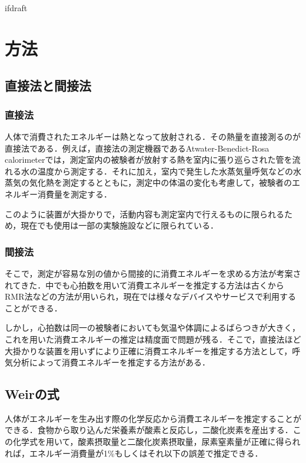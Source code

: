 \expandafter\ifx\csname ifdraft\endcsname\relax
 
\fi

\section{方法}

\subsection{直接法と間接法}

\subsubsection{直接法}

人体で消費されたエネルギーは熱となって放射される．その熱量を直接測るのが直接法である．例えば，直接法の測定機器であるAtwater-Benedict-Rosa calorimeterでは，測定室内の被験者が放射する熱を室内に張り巡らされた管を流れる水の温度から測定する．それに加え，室内で発生した水蒸気量呼気などの水蒸気の気化熱を測定するとともに，測定中の体温の変化も考慮して，被験者のエネルギー消費量を測定する\cite{tanaka_2006}．

このように装置が大掛かりで，活動内容も測定室内で行えるものに限られるため，現在でも使用は一部の実験施設などに限られている．

\subsubsection{間接法}

そこで，測定が容易な別の値から間接的に消費エネルギーを求める方法が考案されてきた．中でも心拍数を用いて消費エネルギーを推定する方法は古くからRMR法などの方法が用いられ\cite{usutani_1990}，現在では様々なデバイスやサービスで利用することができる．

しかし，心拍数は同一の被験者においても気温や体調によるばらつきが大きく，これを用いた消費エネルギーの推定は精度面で問題が残る．そこで，直接法ほど大掛かりな装置を用いずにより正確に消費エネルギーを推定する方法として，呼気分析によって消費エネルギーを推定する方法がある．

\subsection{Weirの式}
人体がエネルギーを生み出す際の化学反応から消費エネルギーを推定することができる．食物から取り込んだ栄養素が酸素と反応し，二酸化炭素を産出する．この化学式を用いて，酸素摂取量と二酸化炭素摂取量，尿素窒素量が正確に得られれば，エネルギー消費量が1\%もしくはそれ以下の誤差で推定できる\cite{livesey_1988}．


